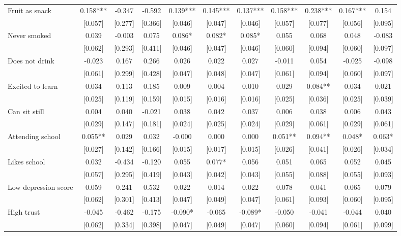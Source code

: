 \documentclass[12pt]{article}
\begin{document}
\begin{table}[ht]
\begin{center}
\begin{adjustbox}{width=1.2\textwidth,center=\textwidth}
\begin{tabular}{l*{10}{c}}
Fruit as snack & 0.158*** & -0.347 & -0.592 & 0.139*** & 0.145*** & 0.137*** & 0.158*** & 0.238*** & 0.167*** & 0.154 \\
 & [0.057] & [0.277] & [0.366] & [0.046] & [0.047] & [0.046] & [0.057] & [0.077] & [0.056] & [0.095] \\
Never smoked & 0.039 & -0.003 & 0.075 & 0.086* & 0.082* & 0.085* & 0.055 & 0.068 & 0.048 & -0.083 \\
 & [0.062] & [0.293] & [0.411] & [0.046] & [0.047] & [0.046] & [0.060] & [0.094] & [0.060] & [0.097] \\
Does not drink & -0.023 & 0.167 & 0.266 & 0.026 & 0.022 & 0.027 & -0.011 & 0.054 & -0.025 & -0.098 \\
 & [0.061] & [0.299] & [0.428] & [0.047] & [0.048] & [0.047] & [0.061] & [0.094] & [0.060] & [0.097] \\
Excited to learn & 0.034 & 0.113 & 0.185 & 0.009 & 0.004 & 0.010 & 0.029 & 0.084** & 0.034 & 0.021 \\
 & [0.025] & [0.119] & [0.159] & [0.015] & [0.016] & [0.016] & [0.025] & [0.036] & [0.025] & [0.039] \\
Can sit still & 0.004 & 0.040 & -0.021 & 0.038 & 0.042 & 0.037 & 0.006 & 0.038 & 0.006 & 0.043 \\
 & [0.029] & [0.147] & [0.181] & [0.024] & [0.025] & [0.024] & [0.029] & [0.061] & [0.029] & [0.061] \\
Attending school & 0.055** & 0.029 & 0.032 & -0.000 & 0.000 & 0.000 & 0.051** & 0.094** & 0.048* & 0.063* \\
 & [0.027] & [0.142] & [0.166] & [0.015] & [0.017] & [0.015] & [0.026] & [0.041] & [0.026] & [0.034] \\
Likes school & 0.032 & -0.434 & -0.120 & 0.055 & 0.077* & 0.056 & 0.051 & 0.065 & 0.052 & 0.045 \\
 & [0.057] & [0.295] & [0.419] & [0.043] & [0.042] & [0.043] & [0.055] & [0.088] & [0.055] & [0.093] \\
Low depression score & 0.059 & 0.241 & 0.532 & 0.022 & 0.014 & 0.022 & 0.078 & 0.041 & 0.065 & 0.079 \\
 & [0.062] & [0.301] & [0.413] & [0.047] & [0.049] & [0.047] & [0.061] & [0.093] & [0.060] & [0.095] \\
High trust & -0.045 & -0.462 & -0.175 & -0.090* & -0.065 & -0.089* & -0.050 & -0.041 & -0.044 & 0.040 \\
 & [0.062] & [0.334] & [0.398] & [0.047] & [0.049] & [0.047] & [0.060] & [0.094] & [0.061] & [0.099] \\


\end{tabular}
\end{adjustbox}
\end{center}
\end{table}
\end{document}
